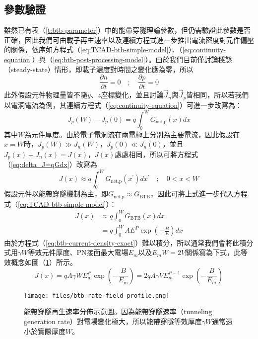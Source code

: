 \subsection{參數驗證}
雖然已有表（\ref{t:btb-parameter}）中的能帶穿隧理論參數，但仍需驗證此參數是否正確，因此我們可由載子再生速率以及連續方程式進一步推出電流密度對元件偏壓的關係，依序如方程式（\ref{eq:TCAD-btb-simple-model}）、（\ref{eq:continuity-equation}）與（\ref{eq:btb-post-processing-model}）。由於我們目前僅討論穩態（steady-state）情形，即載子濃度對時間之變化應為零，所以
\begin{equation}
\frac{\partial n}{\partial t}=0\quad;\quad\frac{\partial p}{\partial t}=0
\end{equation}
此外假設元件物理量皆不隨$y$、$z$座標變化，並且討論$\vec{J}_n$與$\vec{J}_p$皆相同，所以若我們以電洞電流為例，其連續方程式（\ref{eq:continuity-equation}）可進一步改寫為：
\begin{equation}
J_p(W)-J_p(0)=q\int_0^W G_\text{net,p}(x)dx\label{eq:delta_J=qGdx}
\end{equation}
其中$W$為元件厚度。由於電子電洞流在兩電極上分別為主要電流，因此假設在$x=W$時，$J_p(W)\gg J_n(W)$，$J_p(0)\ll J_n(0)$，並且$J_p(x)+J_n(x)=J(x)$，$J(x)$處處相同，所以可將方程式（\ref{eq:delta_J=qGdx}）改寫為
\begin{equation}
J(x)\approx q\int_0^W G_\text{net,p}(x^\prime)dx^\prime\quad;\quad 0<x<W
\end{equation}
假設元件以能帶穿隧機制為主，即$G_\text{net,p}\approx G_\text{BTB}$，因此可將上式進一步代入方程式（\ref{eq:TCAD-btb-simple-model}）：
\begin{equation}
\begin{aligned}
J(x)&\approx q\int_0^W G_\text{BTB}(x)dx\\[5pt]
&=q\int_0^W AE^P\exp\left(-\frac{B}{E}\right)dx\label{eq:btb-current-density-exact}
\end{aligned}
\end{equation}
由於方程式（\ref{eq:btb-current-density-exact}）難以積分，所以通常我們會將此積分式用$\gamma W$等效元件厚度、PN接面最大電場$E_m$以及$E_mW=2V$關係寫為下式，此等效概念如圖（\ref{fig:btb-generation-rate-illustration}）所示。
\begin{equation}
J(x)=qA\gamma WE_\text{m}^P\exp\left(-\frac{B}{E_\text{m}}\right)=2qA\gamma VE_m^{P-1}\exp\left(-\frac{B}{E_m}\right)\label{eq:btb-fitting-exact-form}
\end{equation}
\begin{figure}
\centering
\texttt{[image: files/btb-rate-field-profile.png]}
\caption[能帶穿隧再生速率分佈示意圖]{能帶穿隧再生速率分佈示意圖。因為能帶穿隧速率（tunneling generation rate）對電場變化極大，所以能帶穿隧等效厚度$\gamma W$通常遠小於實際厚度$W$。}
\label{fig:btb-generation-rate-illustration}
\end{figure}
